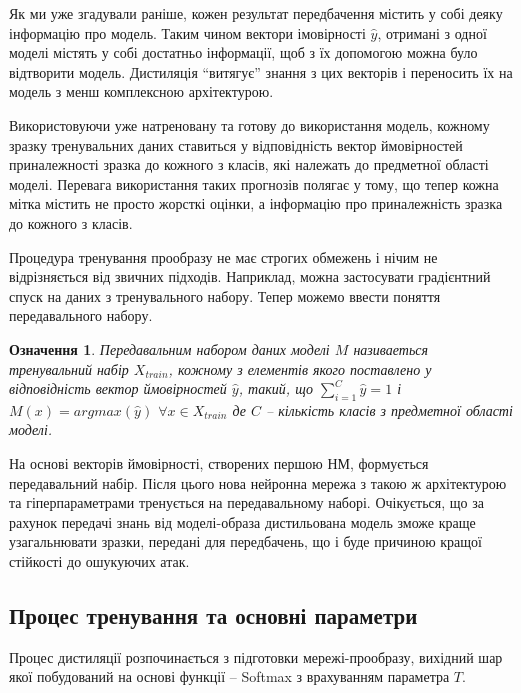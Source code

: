 \documentclass[14pt,a4paper]{extarticle}
\newcounter{e}
\newtheorem{defn}[theorem]{Означення}
\numberwithin{equation}{section}
\numberwithin{figure}{section}
\begin{document}
 Як ми уже згадували раніше, кожен результат передбачення містить у собі деяку інформацію про модель. Таким чином вектори імовірності $\hat{y}$, отримані з одної моделі містять у собі достатньо інформації, щоб з їх допомогою можна було відтворити модель. Дистиляція ``витягує'' знання з цих векторів і переносить їх на модель з менш комплексною архітектурою.
 
 Використовуючи уже натреновану та готову до використання модель, кожному зразку тренувальних даних ставиться у відповідність вектор ймовірностей приналежності зразка до кожного з класів, які належать до предметної області моделі. Перевага використання таких прогнозів полягає у тому, що тепер кожна мітка містить не просто жорсткі оцінки, а інформацію про приналежність зразка до кожного з класів.
 
 
 Процедура тренування прообразу не має строгих обмежень і нічим не відрізняється від звичних підходів. Наприклад, можна застосувати градієнтний спуск на даних з тренувального набору. Тепер можемо ввести поняття передавального набору.
 
 \begin{defn}
 	Передавальним набором даних моделі $M$ називаеться тренувальний набір $X_{train}$, кожному з елементів якого поставлено у відповідність вектор ймовірностей $\hat{y}$, такий, що $\sum\limits^C_{i=1}\hat{y} = 1$ і $M(x)=argmax(\hat{y})$ $ \forall x \in X_{train}$ де $C$ -- кількість класів з предметної області моделі.
 \end{defn}
 
 На основі векторів ймовірності, створених першою НМ, формується передавальний набір. Після цього нова нейронна мережа з такою ж архітектурою та гіперпараметрами тренується на передавальному наборі. Очікується, що за рахунок передачі знань від моделі-образа дистильована модель зможе краще узагальнювати зразки, передані для передбачень, що і буде причиною кращої стійкості до ошукуючих атак.
 
 
 \subsection{Процес тренування та основні параметри}  
 Процес дистиляції розпочинається з підготовки мережі-прообразу, вихідний шар якої побудований на основі функції -- Softmax з врахуванням параметра $T$.
 
\end{document}
